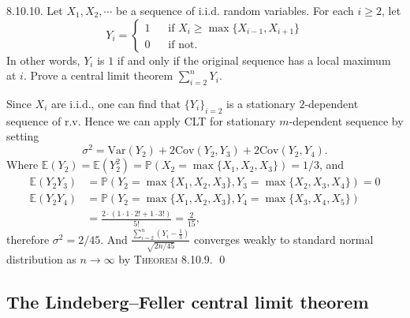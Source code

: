 \begin{exercise}8.10.10.  Let $X_1, X_2,\cdots$ be a sequence of i.i.d. random variables. For each $i\geq2$, let
\begin{equation*}
    Y_i=
    \left\{
    \begin{array}{ll}
    1\;\;\;&\text{if }X_i\geq\max\{X_{i-1},X_{i+1}\}  \\
    0\;\;\;&\text{if not.} 
    \end{array}
    \right.
\end{equation*}
In other words, $Y_i$ is $1$ if and only if the original sequence has a local maximum at $i$. Prove a central limit theorem $\sum_{i=2}^n Y_i$.
\end{exercise}
\begin{answer} Since $X_i$ are i.i.d., one can find that $\{Y_i\}_{i=2}$ is a stationary $2$-dependent sequence of r.v. Hence we can apply CLT for stationary $m$-dependent sequence by setting
\begin{equation*}
\sigma^2=\text{Var}(Y_2)+2\text{Cov}(Y_2,Y_3)+2\text{Cov}(Y_2,Y_4).
\end{equation*}
Where $\mathbb{E}(Y_2)=\mathbb{E}(Y_2^2)=\mathbb{P}(X_2=\max\{X_1,X_2,X_3\})=1/3$, and
\begin{equation*}
    \begin{aligned}
        \mathbb{E}(Y_2Y_3)&=\mathbb{P}(Y_2=\max\{X_1,X_2,X_3\},Y_3=\max\{X_2,X_3,X_4\})=0
        \\
        \mathbb{E}(Y_2Y_4)&=\mathbb{P}(Y_2=\max\{X_1,X_2,X_3\},Y_4=\max\{X_3,X_4,X_5\})
        \\&
        =\frac{2\cdot(1\cdot1\cdot2!+1\cdot3!)}{5!}=\frac{2}{15},
    \end{aligned}
\end{equation*}
therefore $\sigma^2=2/45$. And $\frac{\sum_{i=2}^n(Y_i-\frac{1}{3})}{\sqrt{2n/45}}$ converges weakly to standard normal distribution as $n\rightarrow\infty$ by \textsc{Theorem 8.10.9.} \qed\qquad
\end{answer}

\subsection{The Lindeberg–Feller central limit theorem}

